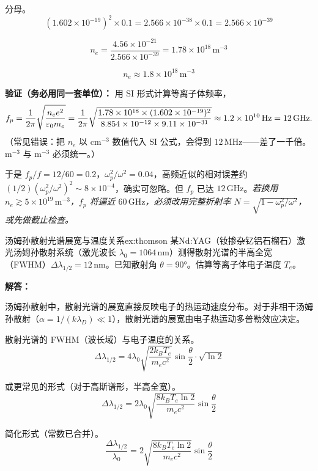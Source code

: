 分母。
\[
    (1.602\times10^{-19})^2 \times 0.1 = 2.566\times10^{-38} \times 0.1 = 2.566\times10^{-39}
\]

\[
    n_e = \frac{4.56\times10^{-21}}{2.566\times10^{-39}} = 1.78\times10^{18}\,\mathrm{m^{-3}}
\]

\[
    \boxed{n_e \approx 1.8\times10^{18}\,\mathrm{m^{-3}}}
\]

\textbf{验证（务必用同一套单位）：} 用 SI 形式计算等离子体频率，
\[
    f_p = \frac{1}{2\pi}\sqrt{\frac{n_e e^2}{\varepsilon_0 m_e}}
    = \frac{1}{2\pi}\sqrt{\frac{1.78\times10^{18}\times(1.602\times10^{-19})^2}{8.854\times10^{-12}\times9.11\times10^{-31}}}
    \approx 1.2\times10^{10}\,\mathrm{Hz} = 12\,\mathrm{GHz}.
\]
（常见错误：把 $n_e$ 以 $\mathrm{cm^{-3}}$ 数值代入 $\mathrm{SI}$ 公式，会得到 $12\,\mathrm{MHz}$——差了一千倍。$\mathrm{m^{-3}}$ 与 $\mathrm{m^{-3}}$ 必须统一。）

于是 $f_p/f = 12/60 = 0.2$，$\omega_p^2/\omega^2 = 0.04$，高频近似的相对误差约 $(1/2)(\omega_p^2/\omega^2)^2 \sim 8\times10^{-4}$，确实可忽略。但 $f_p$ 已达 $12\,\mathrm{GHz}$。\emph{若换用 $n_e\gtrsim5\times10^{19}\,\mathrm{m^{-3}}$，$f_p$ 将逼近 $60\,\mathrm{GHz}$，必须改用完整折射率 $N=\sqrt{1-\omega_p^2/\omega^2}$，或先做截止检查。}


\begin{example}{汤姆孙散射光谱展宽与温度关系}{ex:thomson}
某Nd:YAG（钕掺杂钇铝石榴石）激光汤姆孙散射系统（激光波长 $\lambda_0 = 1064\,\mathrm{nm}$）测得散射光谱的半高全宽（FWHM）$\Delta\lambda_{1/2} = 12\,\mathrm{nm}$。已知散射角 $\theta = 90°$。估算等离子体电子温度 $T_e$。
\end{example}

\textbf{解答：}

汤姆孙散射中，散射光谱的展宽直接反映电子的热运动速度分布。对于非相干汤姆孙散射（$\alpha = 1/(k\lambda_D) \ll 1$），散射光谱的展宽由电子热运动多普勒效应决定。

散射光谱的 FWHM（波长域）与电子温度的关系。
\[
    \Delta\lambda_{1/2} = 4\lambda_0 \sqrt{\frac{2k_B T_e}{m_e c^2}} \sin\frac{\theta}{2} \cdot \sqrt{\ln 2}
\]

或更常见的形式（对于高斯谱形，半高全宽）。
\begin{equation}
    \Delta\lambda_{1/2} = 2\lambda_0 \sqrt{\frac{8k_B T_e \ln 2}{m_e c^2}} \sin\frac{\theta}{2}
\label{eq:ch12-thomson-fwhm}
\end{equation}

简化形式（常数已合并）。
\[
    \frac{\Delta\lambda_{1/2}}{\lambda_0} = 2\sqrt{\frac{8k_B T_e \ln 2}{m_e c^2}} \sin\frac{\theta}{2}
\]


